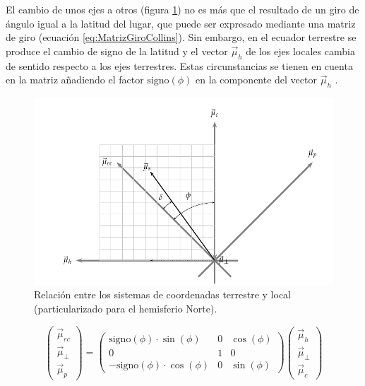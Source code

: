 El cambio de unos ejes a otros (figura \ref{fig:RelacionSistemasCoordenadas})
no es más que el resultado de un giro de ángulo igual a la latitud
del lugar, que puede ser expresado mediante una matriz de giro (ecuación
\ref{eq:MatrizGiroCollins})\cite{CollinsII2004}. Sin embargo, en
el ecuador terrestre se produce el cambio de signo de la latitud y
el vector $\vec{\mu}_{h}$ de los ejes locales cambia de sentido respecto
a los ejes terrestres. Estas circunstancias se tienen en cuenta en
la matriz añadiendo el factor $\mathrm{signo}(\phi)$ en la componente
del vector $\vec{\mu}_{h}$ .

%
\begin{figure}
\includegraphics{../figs/RelacionSistemasCoordenadas}

\caption{Relación entre los sistemas de coordenadas terrestre y local (particularizado
para el hemisferio Norte).\label{fig:RelacionSistemasCoordenadas}}

\end{figure}


\begin{equation}
\left(\begin{array}{c}
\vec{\mu}_{ec}\\
\vec{\mu}_{\bot}\\
\vec{\mu}_{p}\end{array}\right)=\left(\begin{array}{ccc}
\mathrm{signo}(\phi)\cdot\sin(\phi) & 0 & \cos(\phi)\\
0 & 1 & 0\\
-\mathrm{signo}(\phi)\cdot\cos(\phi) & 0 & \sin(\phi)\end{array}\right)\left(\begin{array}{c}
\vec{\mu}_{h}\\
\vec{\mu}_{\bot}\\
\vec{\mu}_{c}\end{array}\right)\label{eq:MatrizGiroCollins}\end{equation}


